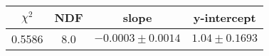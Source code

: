 \begin{tabular}{|c|c|c|c|}

\hline
$\chi^{2}$ & NDF & slope & y-intercept  \\
\hline
0.5586 & 8.0 & $-0.0003\pm0.0014$ & $1.04\pm0.1693$ \\
\hline

\end{tabular}